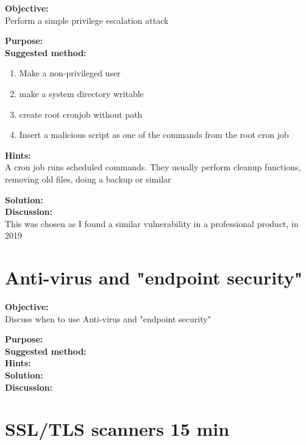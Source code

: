 \documentclass[a4paper,11pt,notitlepage]{report}
\begin{document}
{\bf Objective:}\\
Perform a simple privilege escalation attack

{\bf Purpose:}\\


{\bf Suggested method:}\\

\begin{enumerate}
\item Make a non-privileged user
\item make a system directory writable
\item create root cronjob without path
\item Insert a malicious script as one of the commands from the root cron job
\end{enumerate}

{\bf Hints:}\\
A cron job runs scheduled commands. They usually perform cleanup functions, removing old files, doing a backup or similar

{\bf Solution:}\\


{\bf Discussion:}\\
This was chosen as I found a similar vulnerability in a professional product, in 2019


\chapter{Anti-virus and "endpoint security"}
\label{ex:anti-virus-end-point-security}

{\bf Objective:}\\
Discuss when to use Anti-virus and "endpoint security"

{\bf Purpose:}\\


{\bf Suggested method:}\\


{\bf Hints:}\\


{\bf Solution:}\\


{\bf Discussion:}\\



\chapter{SSL/TLS scanners 15 min}
\label{ex:sslscan}
\end{document}
